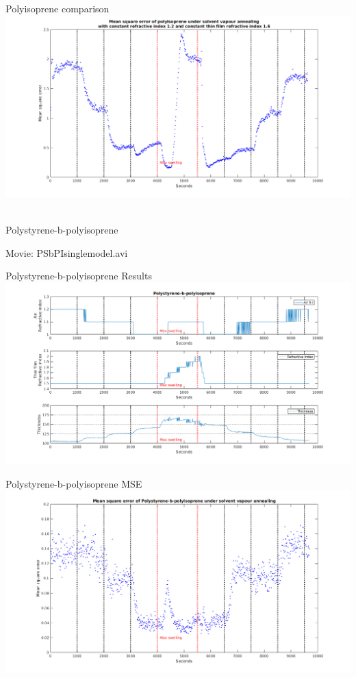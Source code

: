 \documentclass[10pt]{beamer}
\begin{document}
\begin{frame}{Polyisoprene comparison}
	\centering
	\includegraphics[width=\textwidth]{PIn12n16AVG2.png}\
\end{frame}

\begin{frame}{Polystyrene-b-polyisoprene}
\begin{center}
\huge Movie: PSbPIsinglemodel.avi
\end{center}
\end{frame}

\begin{frame}{Polystyrene-b-polyisoprene Results}
\includegraphics[width=\textwidth]{PSbPIsinglemodel1.png}
\end{frame}

\begin{frame}{Polystyrene-b-polyisoprene MSE}
\includegraphics[width=\textwidth]{PSbPIsinglemodel2.png}
\end{frame}
\end{document}
